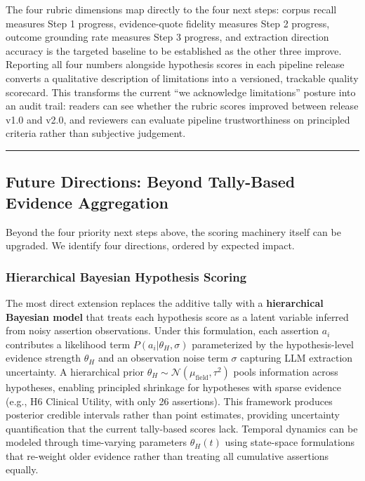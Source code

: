 \documentclass[
  english,
]{article}
\begin{document}
The four rubric dimensions map directly to the four next steps: corpus
recall measures Step 1 progress, evidence-quote fidelity measures Step 2
progress, outcome grounding rate measures Step 3 progress, and
extraction direction accuracy is the targeted baseline to be established
as the other three improve. Reporting all four numbers alongside
hypothesis scores in each pipeline release converts a qualitative
description of limitations into a versioned, trackable quality
scorecard. This transforms the current ``we acknowledge limitations''
posture into an audit trail: readers can see whether the rubric scores
improved between release v1.0 and v2.0, and reviewers can evaluate
pipeline trustworthiness on principled criteria rather than subjective
judgement.

\begin{center}\rule{0.5\linewidth}{0.5pt}\end{center}

\subsection{Future Directions: Beyond Tally-Based Evidence
Aggregation}\label{future-directions-beyond-tally-based-evidence-aggregation}

Beyond the four priority next steps above, the scoring machinery itself
can be upgraded. We identify four directions, ordered by expected
impact.

\subsubsection{Hierarchical Bayesian Hypothesis
Scoring}\label{hierarchical-bayesian-hypothesis-scoring}

The most direct extension replaces the additive tally with a
\textbf{hierarchical Bayesian model} that treats each hypothesis score
as a latent variable inferred from noisy assertion observations. Under
this formulation, each assertion \(a_i\) contributes a likelihood term
\(P(a_i | \theta_H, \sigma)\) parameterized by the hypothesis-level
evidence strength \(\theta_H\) and an observation noise term \(\sigma\)
capturing LLM extraction uncertainty. A hierarchical prior
\(\theta_H \sim \mathcal{N}(\mu_{\text{field}}, \tau^2)\) pools
information across hypotheses, enabling principled shrinkage for
hypotheses with sparse evidence (e.g., H6 Clinical Utility, with only 26
assertions). This framework produces posterior credible intervals rather
than point estimates, providing uncertainty quantification that the
current tally-based scores lack. Temporal dynamics can be modeled
through time-varying parameters \(\theta_H(t)\) using state-space
formulations that re-weight older evidence rather than treating all
cumulative assertions equally.
\end{document}
